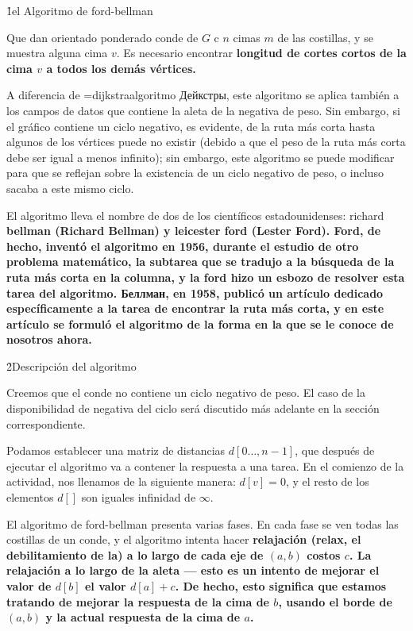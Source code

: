 \h1{el Algoritmo de ford-bellman}

Que dan orientado ponderado conde de $G$ c $n$ cimas $m$ de las costillas, y se muestra alguna cima $v$. Es necesario encontrar \bf{longitud de cortes cortos} de la cima $v$ a todos los demás vértices.

A diferencia de \algohref=dijkstra{algoritmo Дейкстры}, este algoritmo se aplica también a los campos de datos que contiene la aleta de la negativa de peso. Sin embargo, si el gráfico contiene un ciclo negativo, es evidente, de la ruta más corta hasta algunos de los vértices puede no existir (debido a que el peso de la ruta más corta debe ser igual a menos infinito); sin embargo, este algoritmo se puede modificar para que se reflejan sobre la existencia de un ciclo negativo de peso, o incluso sacaba a este mismo ciclo.

El algoritmo lleva el nombre de dos de los científicos estadounidenses: richard \bf{bellman} (Richard Bellman) y leicester \bf{ford} (Lester Ford). Ford, de hecho, inventó el algoritmo en 1956, durante el estudio de otro problema matemático, la subtarea que se tradujo a la búsqueda de la ruta más corta en la columna, y la ford hizo un esbozo de resolver esta tarea del algoritmo. Беллман, en 1958, publicó un artículo dedicado específicamente a la tarea de encontrar la ruta más corta, y en este artículo se formuló el algoritmo de la forma en la que se le conoce de nosotros ahora.


\h2{Descripción del algoritmo}

Creemos que el conde no contiene un ciclo negativo de peso. El caso de la disponibilidad de negativa del ciclo será discutido más adelante en la sección correspondiente.

Podamos establecer una matriz de distancias $d[0 \ldots, n-1]$, que después de ejecutar el algoritmo va a contener la respuesta a una tarea. En el comienzo de la actividad, nos llenamos de la siguiente manera: $d[v] = 0$, y el resto de los elementos $d[]$ son iguales infinidad de $\infty$.

El algoritmo de ford-bellman presenta varias fases. En cada fase se ven todas las costillas de un conde, y el algoritmo intenta hacer \bf{relajación} (relax, el debilitamiento de la) a lo largo de cada eje de $(a,b)$ costos $c$. La relajación a lo largo de la aleta --- esto es un intento de mejorar el valor de $d[b]$ el valor $d[a] + c$. De hecho, esto significa que estamos tratando de mejorar la respuesta de la cima de $b$, usando el borde de $(a,b)$ y la actual respuesta de la cima de $a$.

